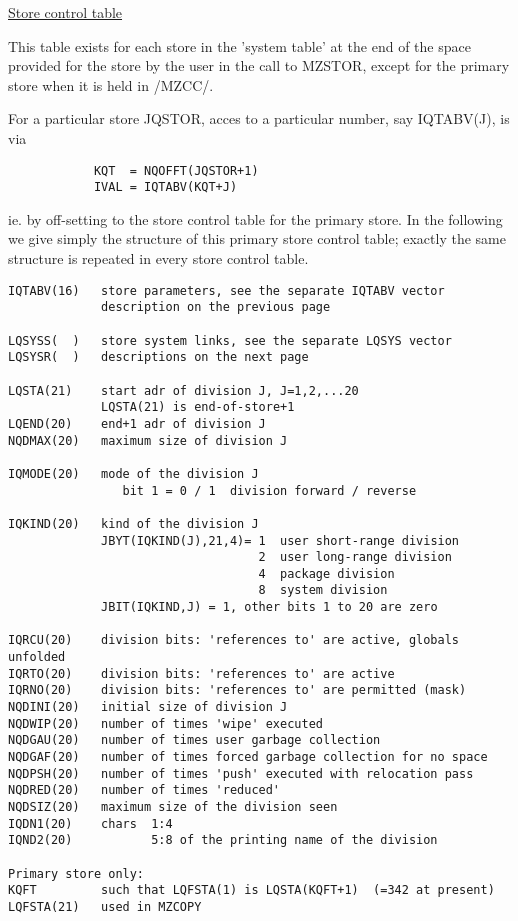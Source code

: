 \begin{flushright} \ul{\large Store control table}
\end{flushright}

This table exists for each store in the 'system table'
at the end of the space
provided for the store by the user in the call to MZSTOR,
except for the primary store when it is held in /MZCC/.

For a particular store JQSTOR, acces to a particular number,
say IQTABV(J), is via
\begin{verbatim}
            KQT  = NQOFFT(JQSTOR+1)
            IVAL = IQTABV(KQT+J)
\end{verbatim} 
ie. by off-setting to the store control table for the primary store.
In the following we give simply the structure of this primary
store control table; exactly the same structure is repeated in every
store control table.

\begin{verbatim}
IQTABV(16)   store parameters, see the separate IQTABV vector
             description on the previous page

LQSYSS(  )   store system links, see the separate LQSYS vector
LQSYSR(  )   descriptions on the next page

LQSTA(21)    start adr of division J, J=1,2,...20
             LQSTA(21) is end-of-store+1
LQEND(20)    end+1 adr of division J
NQDMAX(20)   maximum size of division J

IQMODE(20)   mode of the division J
                bit 1 = 0 / 1  division forward / reverse

IQKIND(20)   kind of the division J
             JBYT(IQKIND(J),21,4)= 1  user short-range division
                                   2  user long-range division
                                   4  package division
                                   8  system division
             JBIT(IQKIND,J) = 1, other bits 1 to 20 are zero

IQRCU(20)    division bits: 'references to' are active, globals unfolded
IQRTO(20)    division bits: 'references to' are active
IQRNO(20)    division bits: 'references to' are permitted (mask)
NQDINI(20)   initial size of division J
NQDWIP(20)   number of times 'wipe' executed
NQDGAU(20)   number of times user garbage collection
NQDGAF(20)   number of times forced garbage collection for no space
NQDPSH(20)   number of times 'push' executed with relocation pass
NQDRED(20)   number of times 'reduced'
NQDSIZ(20)   maximum size of the division seen
IQDN1(20)    chars  1:4
IQND2(20)           5:8 of the printing name of the division

Primary store only:
KQFT         such that LQFSTA(1) is LQSTA(KQFT+1)  (=342 at present)
LQFSTA(21)   used in MZCOPY
\end{verbatim} 

